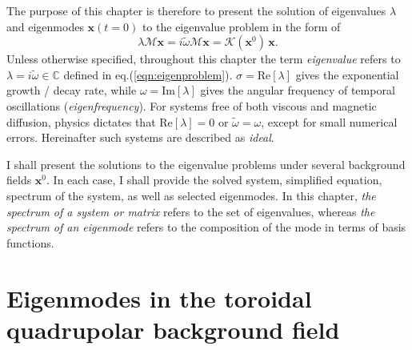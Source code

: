 The purpose of this chapter is therefore to present the solution of eigenvalues $\lambda$ and eigenmodes $\mathbf{x}(t=0)$ to the eigenvalue problem in the form of
\begin{equation}\label{eqn:eigenproblem}
    \lambda \mathcal{M} \mathbf{x} = i \widetilde{\omega} \mathcal{M} \mathbf{x} = \mathcal{K}(\mathbf{x}^0) \, \mathbf{x}.
\end{equation}
Unless otherwise specified, throughout this chapter the term \textit{eigenvalue} refers to $\lambda = i\widetilde{\omega} \in \mathbb{C}$ defined in eq.(\ref{eqn:eigenproblem}). $\sigma = \mathrm{Re}[\lambda]$ gives the exponential growth / decay rate, while $\omega = \mathrm{Im}[\lambda]$ gives the angular frequency of temporal oscillations (\textit{eigenfrequency}).
For systems free of both viscous and magnetic diffusion, physics dictates that $\mathrm{Re}[\lambda] = 0$ or $\widetilde{\omega} = \omega$, except for small numerical errors. Hereinafter such systems are described as \textit{ideal}.

I shall present the solutions to the eigenvalue problems under several background fields $\mathbf{x}^0$. In each case, I shall provide the solved system, simplified equation, spectrum of the system, as well as selected eigenmodes.
In this chapter, \textit{the spectrum of a system or matrix} refers to the set of eigenvalues, whereas \textit{the spectrum of an eigenmode} refers to the composition of the mode in terms of basis functions.

\clearpage





\section{Eigenmodes in the toroidal quadrupolar background field}

\clearpage



